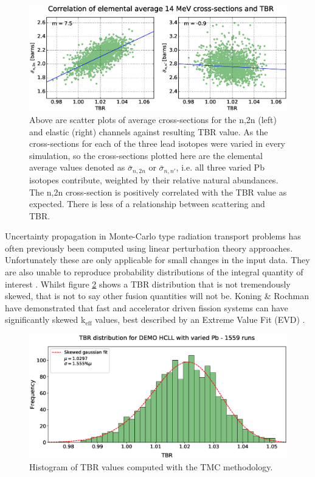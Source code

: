 \begin{figure}[ht]
  \centering
	\includegraphics[width=\textwidth]{pb_tbr_n2n_el_corr}
	\caption{Above are scatter plots of average cross-sections for the n,2n (left) and elastic (right) channels against resulting TBR value. As the cross-sections for each of the three lead isotopes were varied in every simulation, so the cross-sections plotted here are the elemental average values denoted as $\bar{\sigma}_{n,2n}$ or $\bar{\sigma}_{n,n'}$, i.e. all three varied Pb isotopes contribute, weighted by their relative natural abundances. The n,2n cross-section is positively correlated with the TBR value as expected. There is less of a relationship between scattering and TBR.}
	\label{fig:tbr_n2n}
\end{figure}

Uncertainty propagation in Monte-Carlo type radiation transport problems has often previously been computed using linear perturbation theory approaches. Unfortunately these are only applicable for small changes in the input data. They are also unable to reproduce probability distributions of the integral quantity of interest \cite{Rising2012}. Whilst figure \ref{fig:tbr_distribution} shows a TBR distribution that is not tremendously skewed, that is not to say other fusion quantities will not be. Koning \& Rochman have demonstrated that fast and accelerator driven fission systems can have significantly skewed k$_{\mbox{eff}}$ values, best described by an Extreme Value Fit (EVD) \cite{Koning2008}.

\begin{figure}
	\includegraphics[width=\textwidth]{hcll_hist_1559}
	\caption{Histogram of TBR values computed with the TMC methodology.}
	\label{fig:tbr_distribution}
\end{figure}

